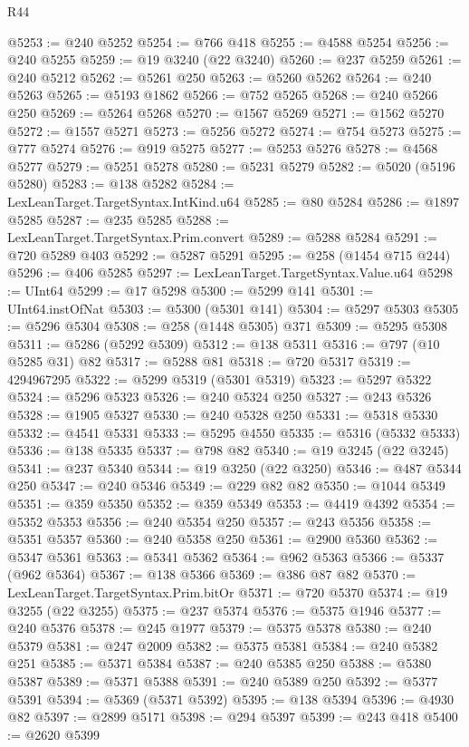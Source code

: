 \begin{lexlean}{R44}
\begin{coremodule}
{@5253 := @240 @5252
@5254 := @766 @418
@5255 := @4588 @5254
@5256 := @240 @5255
@5259 := @19 @3240 (@22 @3240)
@5260 := @237 @5259
@5261 := @240 @5212
@5262 := @5261 @250
@5263 := @5260 @5262
@5264 := @240 @5263
@5265 := @5193 @1862
@5266 := @752 @5265
@5268 := @240 @5266 @250
@5269 := @5264 @5268
@5270 := @1567 @5269
@5271 := @1562 @5270
@5272 := @1557 @5271
@5273 := @5256 @5272
@5274 := @754 @5273
@5275 := @777 @5274
@5276 := @919 @5275
@5277 := @5253 @5276
@5278 := @4568 @5277
@5279 := @5251 @5278
@5280 := @5231 @5279
@5282 := @5020 (@5196 @5280)
@5283 := @138 @5282
@5284 := LexLeanTarget.TargetSyntax.IntKind.u64
@5285 := @80 @5284
@5286 := @1897 @5285
@5287 := @235 @5285
@5288 := LexLeanTarget.TargetSyntax.Prim.convert
@5289 := @5288 @5284
@5291 := @720 @5289 @403
@5292 := @5287 @5291
@5295 := @258 (@1454 @715 @244)
@5296 := @406 @5285
@5297 := LexLeanTarget.TargetSyntax.Value.u64
@5298 := UInt64
@5299 := @17 @5298
@5300 := @5299 @141
@5301 := UInt64.instOfNat
@5303 := @5300 (@5301 @141)
@5304 := @5297 @5303
@5305 := @5296 @5304
@5308 := @258 (@1448 @5305) @371
@5309 := @5295 @5308
@5311 := @5286 (@5292 @5309)
@5312 := @138 @5311
@5316 := @797 (@10 @5285 @31) @82
@5317 := @5288 @81
@5318 := @720 @5317
@5319 := 4294967295
@5322 := @5299 @5319 (@5301 @5319)
@5323 := @5297 @5322
@5324 := @5296 @5323
@5326 := @240 @5324 @250
@5327 := @243 @5326
@5328 := @1905 @5327
@5330 := @240 @5328 @250
@5331 := @5318 @5330
@5332 := @4541 @5331
@5333 := @5295 @4550
@5335 := @5316 (@5332 @5333)
@5336 := @138 @5335
@5337 := @798 @82
@5340 := @19 @3245 (@22 @3245)
@5341 := @237 @5340
@5344 := @19 @3250 (@22 @3250)
@5346 := @487 @5344 @250
@5347 := @240 @5346
@5349 := @229 @82 @82
@5350 := @1044 @5349
@5351 := @359 @5350
@5352 := @359 @5349
@5353 := @4419 @4392
@5354 := @5352 @5353
@5356 := @240 @5354 @250
@5357 := @243 @5356
@5358 := @5351 @5357
@5360 := @240 @5358 @250
@5361 := @2900 @5360
@5362 := @5347 @5361
@5363 := @5341 @5362
@5364 := @962 @5363
@5366 := @5337 (@962 @5364)
@5367 := @138 @5366
@5369 := @386 @87 @82
@5370 := LexLeanTarget.TargetSyntax.Prim.bitOr
@5371 := @720 @5370
@5374 := @19 @3255 (@22 @3255)
@5375 := @237 @5374
@5376 := @5375 @1946
@5377 := @240 @5376
@5378 := @245 @1977
@5379 := @5375 @5378
@5380 := @240 @5379
@5381 := @247 @2009
@5382 := @5375 @5381
@5384 := @240 @5382 @251
@5385 := @5371 @5384
@5387 := @240 @5385 @250
@5388 := @5380 @5387
@5389 := @5371 @5388
@5391 := @240 @5389 @250
@5392 := @5377 @5391
@5394 := @5369 (@5371 @5392)
@5395 := @138 @5394
@5396 := @4930 @82
@5397 := @2899 @5171
@5398 := @294 @5397
@5399 := @243 @418
@5400 := @2620 @5399
}
\end{coremodule}
\end{lexlean}
